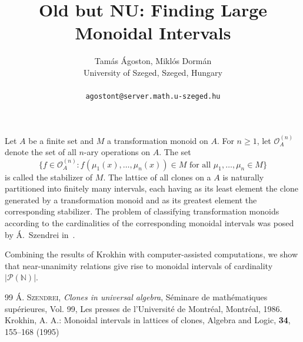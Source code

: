 \documentclass[a4paper]{article} %
\date{} %
\begin{document}
	\setcounter{page}{1} %
	
	\title{Old but NU: Finding Large Monoidal Intervals}
	
	\author{Tamás Ágoston, Miklós Dormán \\ %
		University of Szeged, Szeged, Hungary\\ \\ %
		\texttt{agostont@server.math.u-szeged.hu} %
	}%
	
	\maketitle
	
	
	Let $A$ be a finite set and $M$ a transformation monoid on $A$.  For $n\geq 1$, let $\mathcal{O}_A^{(n)}$ denote the set of all $n$-ary operations on $A$. The set \[\{f\in \mathcal{O}_A^{(n)}\colon f(\mu_1(x),\dots,\mu_n(x))\in M \text{ for all } \mu_1,\dots,\mu_n \in M\} \] is called the stabilizer of $M$. The lattice of all clones on a $A$ is naturally partitioned into finitely many intervals, each having as its least element the clone generated by a transformation monoid and  as its greatest element the corresponding stabilizer. The problem of classifying transformation monoids according to the cardinalities of the corresponding monoidal intervals was posed by Á.~Szendrei in~\cite{TamasAgoston_AS}. 
	
	Combining the results of Krokhin \cite{AAK95} with computer-assisted computations, we show that near-unanimity relations give rise to monoidal intervals of cardinality $\lvert \mathcal{P}(\mathbb{N})\rvert$. 
	
	
	\begin{thebibliography}{99}
		\textsc{Á. Szendrei}, \textit{Clones in universal algebra}, Séminare de mathématiques supérieures, Vol. 99, Les presses de l'Université de Montréal, Montréal, 1986.
		Krokhin, A. A.: 
		Monoidal intervals in lattices of clones, 
		Algebra and Logic, {\bf 34}, 155–168 (1995)
		
	\end{thebibliography}
	
\end{document}
